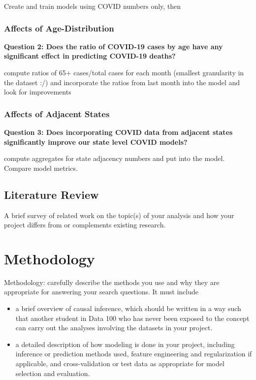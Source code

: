\documentclass[11pt]{article}
\begin{document}
Create and train models using COVID numbers only, then 

\subsubsection{Affects of Age-Distribution}


\noindent\textbf{Question 2: Does the ratio of COVID-19 cases by age have any significant effect in predicting COVID-19 deaths?}

compute ratios of 65+ cases/total cases for each month (smallest granularity in the dataset :/) and incorporate the ratios from last month into the model and look for improvements 

\subsubsection{Affects of Adjacent States}

\noindent\textbf{Question 3: Does incorporating COVID data from adjacent states significantly improve our state level COVID models? }

compute aggregates for state adjacency numbers and put into the model. Compare model metrics. 



\subsection{Literature Review}
A brief survey of related work on the topic(s) of your analysis and how your project differs from or complements existing research.

\section{Methodology}

Methodology: carefully describe the methods you use and why they are appropriate for answering your search questions. It must include
\begin{itemize}
\item a brief overview of causal inference, which should be written in a way such that another student in Data 100 who has never been exposed to the concept can carry out the analyses involving the datasets in your project.
\item a detailed description of how modeling is done in your project, including inference or prediction methods used, feature engineering and regularization if applicable, and cross-validation or test data as appropriate for model selection and evaluation.
\end{itemize}
\end{document}
